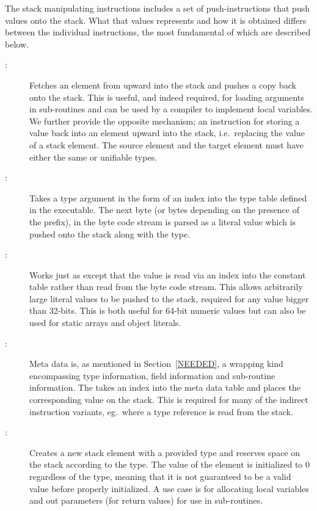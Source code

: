 The stack manipulating instructions includes a set of push-instructions that
push values onto the stack. What that values represents and how it is obtained
differs between the individual instructions, the most fundamental of which are
described below.

\begin{description}

\item[:]

  Fetches an element from upward into the stack and pushes a copy back onto the
  stack. This is useful, and indeed required, for loading arguments in
  sub-routines and can be used by a compiler to implement local variables. We
  further provide the opposite mechanism; an instruction for storing a value
  back into an element upward into the stack, i.e.~replacing the value of a
  stack element. The source element and the target element must have either the
  same or unifiable types.

\item[:]

  Takes a type argument in the form of an index into the type table defined in
  the executable. The next byte (or bytes depending on the presence of the
   prefix), in the byte code stream is parsed as a literal value
  which is pushed onto the stack along with the type.

\item[:]

  Works just as  except that the value is read via an index
  into the constant table rather than read from the byte code stream. This
  allows arbitrarily large literal values to be pushed to the stack, required
  for any value bigger than 32-bits. This is both useful for 64-bit numeric
  values but can also be used for static arrays and object literals.

\item[:]

  Meta data is, as mentioned in Section~\ref{NEEDED}, a wrapping kind
  encompassing type information, field information and sub-routine
  information. The  takes an index into the meta data table and
  places the corresponding value on the stack. This is required for many of the
  indirect instruction variants, eg.~where a type reference is read from the
  stack.

\item[:]

  Creates a new stack element with a provided type and reserves space on the
  stack according to the type. The value of the element is initialized to 0
  regardless of the type, meaning that it is not guaranteed to be a valid value
  before properly initialized. A use case is for allocating local variables and
  out parameters (for return values) for use in sub-routines.

\end{description}

